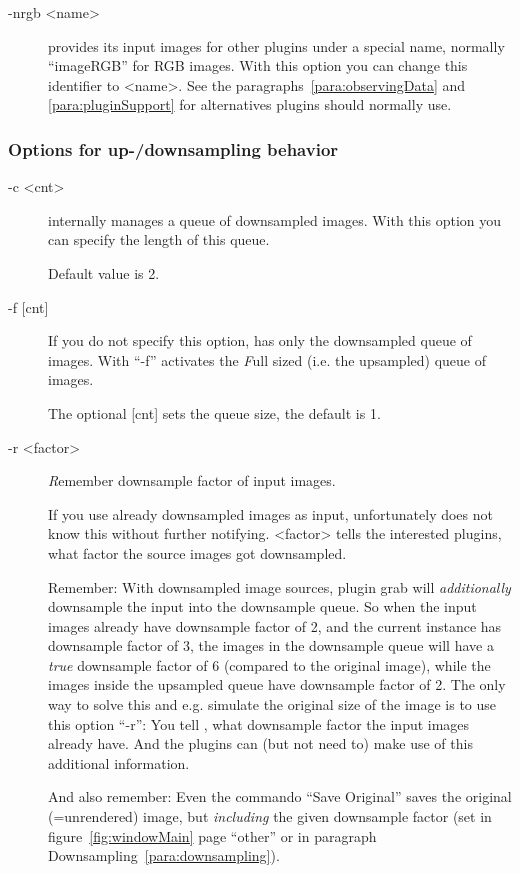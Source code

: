 \begin{description}
\item[-nrgb \textless{}name\textgreater{}] \icewing{} provides its
  input images for other plugins under a special name, normally
  ``imageRGB'' for RGB images. With this option you can change this
  identifier to \textless{}name\textgreater{}. See the
  paragraphs~\ref{para:observingData} and \ref{para:pluginSupport}
  for alternatives plugins should normally use.

\end{description}

\subsubsection {Options for up-/downsampling behavior}

\begin{description}
\item[ -c \textless{}cnt\textgreater{}]
  \icewing{} internally manages a queue of downsampled images. With
  this option you can specify the length of this queue.

  Default value is 2.

\item[ -f [cnt{]}]
  If you do not specify this option, \icewing{} has only the
  downsampled queue of images. With ``-f'' \icewing{} activates the
  {\em F}ull sized (i.e. the upsampled) queue of images.

  The optional [cnt] sets the queue size, the default is 1.

\item[-r \textless{}factor\textgreater{}]
  {\em R}emember downsample factor of input images.

  If you use already downsampled images as input, unfortunately
  \icewing{} does not know this without further
  notifying. \textless{}factor\textgreater{} tells the interested
  plugins, what factor the source images got downsampled.

  Remember: With downsampled image sources, plugin grab will {\em
    additionally} downsample the input into the downsample queue. So
  when the input images already have downsample factor of 2, and the
  current \icewing{} instance has downsample factor of 3, the images
  in the downsample queue will have a {\em true} downsample factor
  of 6 (compared to the original image), while the images inside
  the upsampled queue have downsample factor of 2. The only way to
  solve this and e.g. simulate the original size of the image is to
  use this option ``-r'': You tell \icewing{}, what downsample
  factor the input images already have. And the plugins can (but not
  need to) make use of this additional information.

  And also remember: Even the commando ``Save Original'' saves the
  original (=unrendered) image, but {\em including} the given
  downsample factor (set in figure~\ref{fig:windowMain} page
  ``other'' or in paragraph Downsampling~\ref{para:downsampling}).

\end{description}

